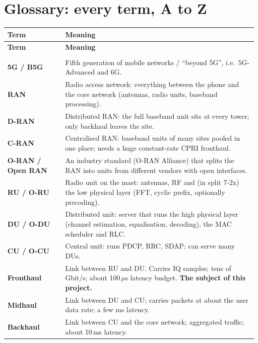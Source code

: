 \documentclass[11pt,a4paper]{article}
\begin{document}
\section{Glossary: every term, A to Z}

\small
\renewcommand{\arraystretch}{1.25}
\begin{longtable}{>{\raggedright\arraybackslash\bfseries}p{3.6cm}>{\raggedright\arraybackslash}p{12.2cm}}
\toprule
\normalfont\textbf{Term} & \textbf{Meaning} \\
\midrule
\endfirsthead
\toprule
\normalfont\textbf{Term} & \textbf{Meaning} \\
\midrule
\endhead
\bottomrule
\endfoot
\multicolumn{2}{l}{\color{iitblue}\normalsize\textbf{Network and radio}}\\
5G / B5G & Fifth generation of mobile networks / ``beyond 5G'', i.e.\ 5G-Advanced and 6G. \\
RAN & Radio access network: everything between the phone and the core network (antennas, radio units, baseband processing). \\
D-RAN & Distributed RAN: the full baseband unit sits at every tower; only backhaul leaves the site. \\
C-RAN & Centralised RAN: baseband units of many sites pooled in one place; needs a huge constant-rate CPRI fronthaul. \\
O-RAN / Open RAN & An industry standard (O-RAN Alliance) that splits the RAN into units from different vendors with open interfaces. \\
RU / O-RU & Radio unit on the mast: antennas, RF and (in split 7-2x) the low physical layer (FFT, cyclic prefix, optionally precoding). \\
DU / O-DU & Distributed unit: server that runs the high physical layer (channel estimation, equalisation, decoding), the MAC scheduler and RLC. \\
CU / O-CU & Central unit: runs PDCP, RRC, SDAP; can serve many DUs. \\
Fronthaul & Link between RU and DU. Carries IQ samples; tens of Gbit/s; about 100\,$\mu$s latency budget. \textbf{The subject of this project.} \\
Midhaul & Link between DU and CU; carries packets at about the user data rate; a few ms latency. \\
Backhaul & Link between CU and the core network; aggregated traffic; about 10\,ms latency. \\

\end{longtable}
\end{document}
